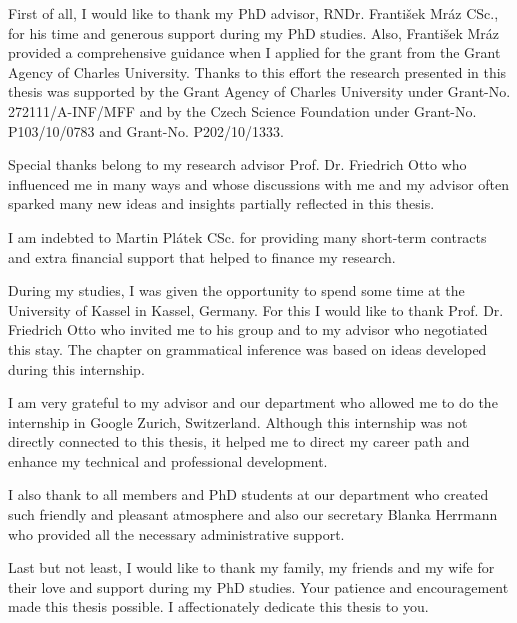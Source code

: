 \documentclass[12pt,a4paper,twoside,openright,natbib]{book}
\begin{document}
\newpage


\openright

\noindent
First of all, I would like to thank my PhD advisor, RNDr. František Mráz CSc., for his time and generous support during my PhD studies. Also, František Mráz provided a comprehensive guidance when I applied for the grant from the Grant Agency of Charles University. Thanks to this effort the research presented in this thesis was supported by the Grant Agency of Charles University under Grant-No. 272111/A-INF/MFF and by the Czech Science Foundation under Grant-No. P103/10/0783 and Grant-No. P202/10/1333.

Special thanks belong to my research advisor Prof. Dr. Friedrich Otto who influenced me in many ways and whose discussions with me and my advisor often sparked many new ideas and insights partially reflected in this thesis.

I am indebted to Martin Plátek CSc. for providing many short-term contracts and extra financial support that helped to finance my research.

During my studies, I was given the opportunity to spend some time at the University of Kassel in Kassel, Germany. For this I would like to thank Prof. Dr. Friedrich Otto who invited me to his group and to my advisor who negotiated this stay. The chapter on grammatical inference was based on ideas developed during this internship.

I am very grateful to my advisor and our department who allowed me to do the internship in Google Zurich, Switzerland. Although this internship was not directly connected to this thesis, it helped me to direct my career path and enhance my technical and professional development.

I also thank to all members and PhD students at our department who created such friendly and pleasant atmosphere and also our secretary Blanka Herrmann who provided all the necessary administrative support.

Last but not least, I would like to thank my family, my friends and my wife for their love and support during my PhD studies. Your patience and encouragement made this thesis possible. I affectionately dedicate this thesis to you.

\newpage

\end{document}
